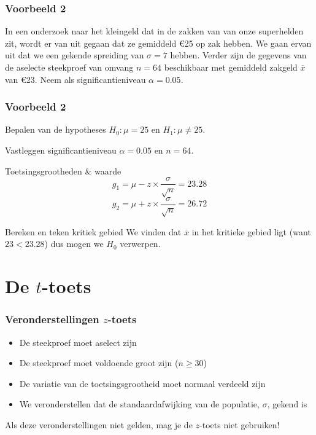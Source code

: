 \documentclass{beamer}
\begin{document}
\begin{frame}
  \frametitle{Voorbeeld 2}
  In een onderzoek naar het kleingeld dat in de zakken van  van  onze superhelden zit, wordt er van uit gegaan dat ze gemiddeld \euro{25} op zak hebben. We gaan ervan uit dat we een gekende spreiding van $\sigma = 7$ hebben. Verder zijn de gegevens van de aselecte steekproef van omvang $n=64$ beschikbaar met gemiddeld zakgeld $\overline{x}$ van \euro{23}. Neem als significantieniveau $\alpha = 0.05$.
\end{frame}

\begin{frame}
  \frametitle{Voorbeeld 2}
  \begin{block}{Bepalen van de hypotheses}
  $H_{0} : \mu = 25$ en $H_{1}: \mu \neq 25$.
  \end{block}

  \begin{block}{Vastleggen significantieniveau}
  $\alpha = 0.05$ en $n=64$.
  \end{block}

  \begin{block}{Toetsingsgrootheden \& waarde}
    \[ g_{1} = \mu - z \times \frac{\sigma}{\sqrt{n}} = 23.28 \]
    \[ g_{2} = \mu + z \times \frac{\sigma}{\sqrt{n}} = 26.72 \]
    \end{block}

    \begin{block}{Bereken en teken kritiek gebied}
      We vinden dat $\overline{x}$ in het kritieke gebied ligt (want $23 < 23.28$) dus mogen we $H_{0}$ verwerpen.
  \end{block}
\end{frame}

\section{De $t$-toets}
\sectionframelogo{}

\begin{frame}
  \frametitle{Veronderstellingen $z$-toets}
  
  
  \begin{itemize}
    \item De steekproef moet aselect zijn
    \item De steekproef moet voldoende groot zijn ($n \ge 30$)
    \item De variatie van de toetsingsgrootheid moet normaal verdeeld zijn
    \item We veronderstellen dat de standaardafwijking van de populatie, $\sigma$, gekend is
  \end{itemize}

  Als deze veronderstellingen niet gelden, mag je de $z$-toets niet gebruiken!
\end{frame}
\end{document}

